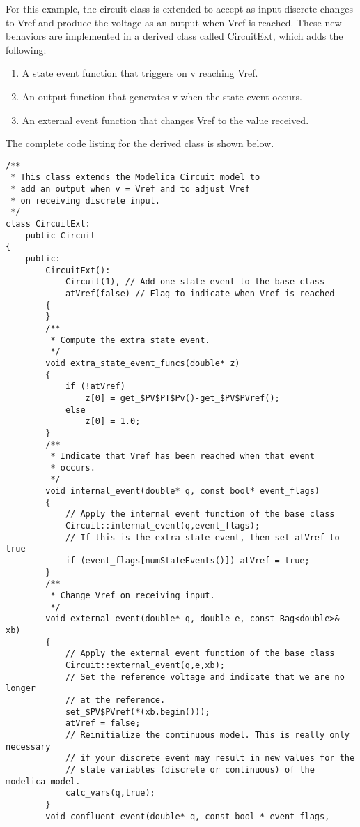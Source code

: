 For this example, the circuit class is extended to accept as input discrete changes to Vref and produce the voltage as an output when Vref is reached. These new behaviors are implemented in a derived class called CircuitExt, which adds the following:
\begin{enumerate}
\item A state event function that triggers on v reaching Vref.
\item An output function that generates v when the state event occurs.
\item An external event function that changes Vref to the value received.
\end{enumerate}
The complete code listing for the derived class is shown below.
\begin{verbatim}
/**
 * This class extends the Modelica Circuit model to
 * add an output when v = Vref and to adjust Vref
 * on receiving discrete input.
 */
class CircuitExt:
    public Circuit
{
    public:
        CircuitExt():
            Circuit(1), // Add one state event to the base class
            atVref(false) // Flag to indicate when Vref is reached
        {
        }
        /**
         * Compute the extra state event.
         */
        void extra_state_event_funcs(double* z)
        {
            if (!atVref)
                z[0] = get_$PV$PT$Pv()-get_$PV$PVref();
            else
                z[0] = 1.0;
        }
        /**
         * Indicate that Vref has been reached when that event
         * occurs.
         */
        void internal_event(double* q, const bool* event_flags)
        {
            // Apply the internal event function of the base class
            Circuit::internal_event(q,event_flags);
            // If this is the extra state event, then set atVref to true
            if (event_flags[numStateEvents()]) atVref = true;
        }
        /**
         * Change Vref on receiving input.
         */
        void external_event(double* q, double e, const Bag<double>& xb)
        {
            // Apply the external event function of the base class
            Circuit::external_event(q,e,xb);
            // Set the reference voltage and indicate that we are no longer
            // at the reference.
            set_$PV$PVref(*(xb.begin()));
            atVref = false;
            // Reinitialize the continuous model. This is really only necessary
            // if your discrete event may result in new values for the 
            // state variables (discrete or continuous) of the modelica model.
            calc_vars(q,true);
        }
        void confluent_event(double* q, const bool * event_flags,

\end{verbatim}
